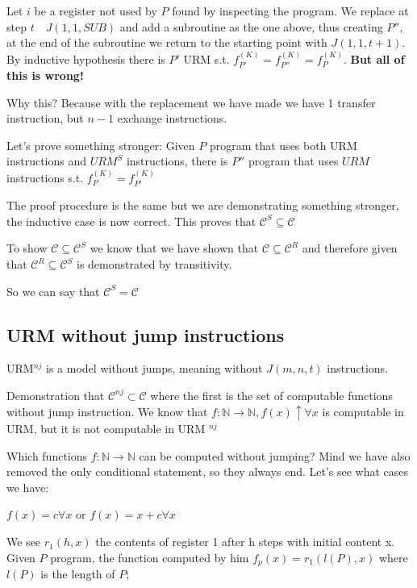 \documentclass{amsbook}
\newcommand{\nat}{\ensuremath{\mathbb{N}}}
\theoremstyle{definition}
\theoremstyle{remark}
\numberwithin{section}{chapter}
\numberwithin{equation}{chapter}
\begin{document}
Let $i$ be a register not used by $P$ found by inspecting the program. We replace at step $t \quad J (1,1, SUB)$ and add a subroutine as the one above, thus creating $ P'' $, at the end of the subroutine we return to the starting point with $J (1,1, t + 1)$. By inductive hypothesis there is $ P' $ URM s.t. $ f_{P'}^{(K)} = f_{P''}^{(K)} = f_{P}^{(K)}$. \textbf{But all of this is wrong!}

Why this? Because with the replacement we have made we have 1 transfer instruction, but $n-1$ exchange instructions.

Let's prove something stronger: Given $P$ program that uses both URM instructions and  $URM^S $ instructions, there is $ P'' $ program that uses $URM$ instructions s.t. $ f_{P}^{(K)} = f_{P'}^{(K)} $

The proof procedure is the same but we are demonstrating something stronger, the inductive case is now correct. This proves that $ \mathcal{C}^S \subseteq \mathcal{C} $

To show $  \mathcal{C} \subseteq \mathcal{C}^S $ we know that we have shown that $ \mathcal{C} \subseteq \mathcal{C}^R $ and therefore given that $ \mathcal{C}^R \subseteq \mathcal{C}^S $ is demonstrated by transitivity.

So we can say that $ \mathcal{C}^S = \mathcal{C} $

\subsection{URM without jump instructions}

URM$ ^{nj} $ is a model without jumps, meaning without $J(m,n,t)$ instructions.

Demonstration that $ \mathcal{C}^{nj} \subset \mathcal{C} $ where the first is the set of computable functions without jump instruction. We know that $ f: \nat \rightarrow \nat, f(x)\uparrow \forall x $ is computable in URM, but it is not computable in URM $ ^{nj} $

Which functions $ f: \nat \rightarrow \nat $ can be computed without jumping? Mind we have also removed the only conditional statement, so they always end. Let's see what cases we have:

$f(x) = c  \forall x $ or $ f(x) = x + c \forall x $

We see $ r_1(h,x) $ the contents of register 1 after h steps with initial content x. Given $P$ program, the function computed by him $ f_p(x) = r_1(l(P), x) $ where $ l(P) $ is the length of $P$;
\end{document}
